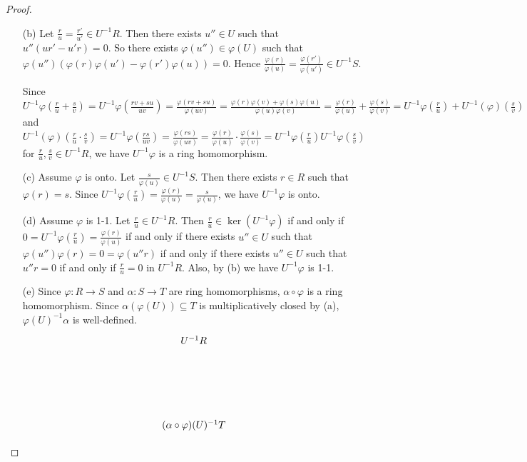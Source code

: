 \begin{proof}
    \begin{enumerate}
        \item [(b)] 
            Let $\frac{r}{u} = \frac{r'}{u'} \in U^{-1}R$. Then there exists $u'' \in U$ such that $u''(ur'-u'r) = 0$. So there exists $\varphi(u'') \in \varphi(U)$ such that $\varphi(u'')(\varphi(r)\varphi(u') - \varphi(r')\varphi(u)) = 0$. Hence $\frac{\varphi(r)}{\varphi(u)} = \frac{\varphi(r')}{\varphi(u')} \in U^{-1}S$. \par  
            Since $U^{-1}\varphi(\frac{r}{u} + \frac{s}{v}) = U^{-1}\varphi(\frac{rv+su}{uv}) = \frac{\varphi(rv+su)}{\varphi(uv)} = \frac{\varphi(r)\varphi(v)+\varphi(s)\varphi(u)}{\varphi(u)\varphi(v)} = \frac{\varphi(r)}{\varphi(u)}+\frac{\varphi(s)}{\varphi(v)} = U^{-1}\varphi(\frac{r}{u})+U^{-1}(\varphi)(\frac{s}{v})$ and $U^{-1}(\varphi)(\frac{r}{u} \cdot\frac{s}{v}) = U^{-1}\varphi(\frac{rs}{uv}) = \frac{\varphi(rs)}{\varphi(uv)} =\frac{\varphi(r)}{\varphi(u)} \cdot \frac{\varphi(s)}{\varphi(v)} = U^{-1}\varphi(\frac{r}{u})U^{-1}\varphi(\frac{s}{v})$ for $\frac{r}{u},\frac{s}{v} \in U^{-1}R$, we have $U^{-1}\varphi$ is a ring homomorphism. 
        \item [(c)]
            Assume $\varphi$ is onto. Let $\frac{s}{\varphi(u)} \in U^{-1}S$. Then there exists $r \in R$ such that $\varphi(r) = s$. Since $U^{-1}\varphi(\frac{r}{u}) = \frac{\varphi(r)}{\varphi(u)} = \frac{s}{\varphi(u)}$, we have $U^{-1}\varphi$ is onto.
        \item[(d)] Assume $\varphi$ is 1-1. Let $\frac{r}{u} \in U^{-1}R$. Then $\frac{r}{u} \in \ker(U^{-1}\varphi)$ if and only if $0 = U^{-1}\varphi(\frac{r}{u}) = \frac{\varphi(r)}{\varphi(u)}$ if and only if there exists $u'' \in U$ such that $\varphi(u'')\varphi(r) = 0 = \varphi(u''r)$ if and only if there exists $u'' \in U$ such that $u''r = 0$ if and only if $\frac{r}{u} = 0$ in $U^{-1}R$. Also, by (b) we have $U^{-1}\varphi$ is 1-1.
        \item[(e)]
            Since $\varphi:R \to S$ and $\alpha: S \to T$ are ring homomorphisms, $\alpha \circ \varphi$ is a ring homomorphism. Since $\alpha(\varphi(U)) \subseteq T$ is multiplicatively closed by (a), $\varphi(U)^{-1}\alpha$ is well-defined. 
        \[
            \begin{tikzpicture}[auto]
                \node (UR) {$U^{-1}R$};
                \node (UT)[node distance=3cm, below of=UR] {$(\alpha \circ \varphi)(U)^{-1}T$};
                \node (XXX)[node distance=1.5cm, below of=UR] {};

\end{tikzpicture}\]
\end{enumerate}
\end{proof}
